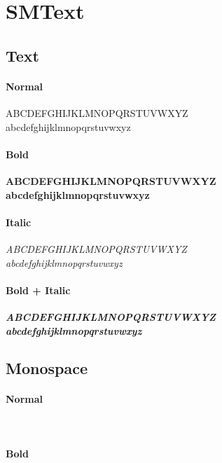 \documentclass[class=scrartcl,crop=false]{standalone}
\begin{document}
\section{SMText}

\subsection{Text}

\paragraph{Normal}

ABCDEFGHIJKLMNOPQRSTUVWXYZ\\
abcdefghijklmnopqrstuvwxyz

\paragraph{Bold}

\textbf{ABCDEFGHIJKLMNOPQRSTUVWXYZ}\\
\textbf{abcdefghijklmnopqrstuvwxyz}

\paragraph{Italic}

\textit{ABCDEFGHIJKLMNOPQRSTUVWXYZ}\\
\textit{abcdefghijklmnopqrstuvwxyz}

\paragraph{Bold + Italic}

\textbf{\textit{ABCDEFGHIJKLMNOPQRSTUVWXYZ}}\\
\textbf{\textit{abcdefghijklmnopqrstuvwxyz}}


\subsection{Monospace}

\paragraph{Normal}

\\

\paragraph{Bold}
\end{document}
